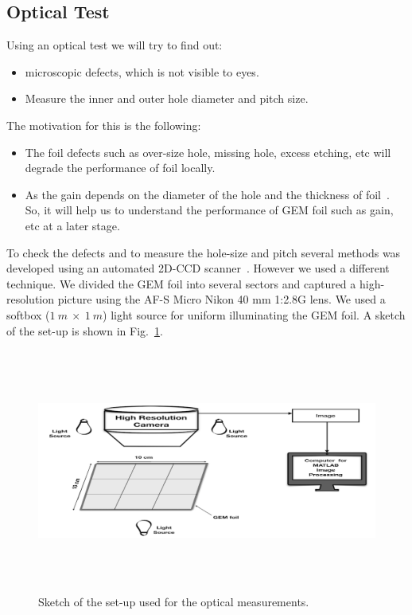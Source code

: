 \subsection{Optical Test} %
\label{sub:optical_test}
Using an optical test we will try to find out:
\begin{itemize}
    \item microscopic defects, which is not visible to eyes.
    \item Measure the inner and outer hole diameter and pitch size.
\end{itemize}
The motivation for this is the following:
\begin{itemize}
    \item The foil defects such as over-size hole, missing hole, excess etching, etc will degrade the performance of foil locally.
    \item As the gain depends on the diameter of the hole and the thickness of foil~. So, it will help us to understand the performance of GEM foil such as gain, etc at a later stage.
\end{itemize}
To check the defects and to measure the hole-size and pitch several methods was developed using an automated 2D-CCD scanner~\cite{Posik2015, Becker2006}. 
However we used a different technique.
We divided the GEM foil into several sectors and captured a high-resolution picture using the AF-S Micro Nikon 40 mm 1:2.8G lens.
We used a softbox ($1~m~\times~1~m$) light source for uniform illuminating the GEM foil.
A sketch of the set-up is shown in Fig.~\ref{fig:Optical_Sketch}.
\begin{figure}[!htbp]
    \centering
        \includegraphics[width=12cm, height=8cm]{figures/GEM/figures/2.jpeg}
   \caption{Sketch of the set-up used for the optical measurements.}   \label{fig:Optical_Sketch}
\end{figure}
